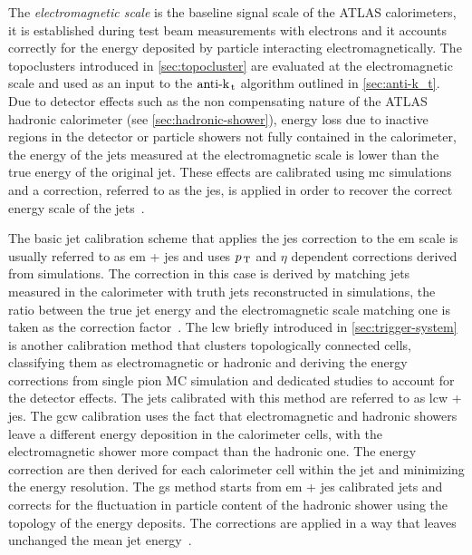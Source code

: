 The \emph{electromagnetic scale} is the baseline signal scale of the ATLAS
calorimeters, it is established during test beam measurements with electrons and
it accounts correctly for the energy deposited by particle interacting
electromagnetically. The topoclusters introduced in \cref{sec:topocluster} are
evaluated at the electromagnetic scale and used as an input to the $\text{anti-k}_\mathrm{\, t}$
algorithm outlined in \cref{sec:anti-k_t}. Due to detector effects such as the
non compensating nature of the ATLAS hadronic calorimeter (see
\cref{sec:hadronic-shower}), energy loss due to inactive regions in the detector
or particle showers not fully contained in the calorimeter, the energy of the
jets measured at the electromagnetic scale is lower than the true energy of the
original jet. These effects are calibrated using \gls{mc} simulations and a
correction, referred to as the \gls{jes}, is applied in order to recover the
correct energy scale of the jets~\cite{JESIntro}.

The basic jet calibration scheme that applies the \gls{jes} correction to the
\gls{em} scale is usually referred to as \gls{em} + \gls{jes} and uses $p_\mathrm{\, T}$ and
$\eta$ dependent corrections derived from simulations. The correction in this
case is derived by matching jets measured in the calorimeter with truth jets
reconstructed in simulations, the ratio between the true jet energy and the
electromagnetic scale matching one is taken as the correction
factor~\cite{JESEMCalibration}. The \gls{lcw} briefly introduced in
\cref{sec:trigger-system} is another calibration method that clusters
topologically connected cells, classifying them as electromagnetic or hadronic
and deriving the energy corrections from single pion MC simulation and dedicated
studies to account for the detector effects. The jets calibrated with this
method are referred to as \gls{lcw} + \gls{jes}\@. The \gls{gcw} calibration
uses the fact that electromagnetic and hadronic showers leave a different energy
deposition in the calorimeter cells, with the electromagnetic shower more
compact than the hadronic one. The energy correction are then derived for each
calorimeter cell within the jet and minimizing the energy resolution. The
\gls{gs} method starts from \gls{em} + \gls{jes} calibrated jets and corrects
for the fluctuation in particle content of the hadronic shower using the
topology of the energy deposits. The corrections are applied in a way that
leaves unchanged the mean jet energy~\cite{JetCalib}.
